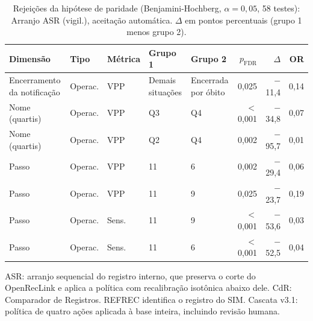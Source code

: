 \begin{table}[htbp]
\centering
\caption{Rejei\c{c}\~oes da hip\'otese de paridade (Benjamini-Hochberg, $\alpha = 0{,}05$, 58 testes): Arranjo ASR (vigil.), aceitação automática. $\Delta$ em pontos percentuais (grupo 1 menos grupo 2).}
\label{tab:equidade-arranjo-rejeicoes-arranjo-P-vigilancia}
\footnotesize\setlength{\tabcolsep}{3pt}
\begin{tabular}{lllllrrr}
\toprule
Dimens\~ao & Tipo & M\'etrica & Grupo 1 & Grupo 2 & $p_{\mathrm{FDR}}$ & $\Delta$ & OR \\
\midrule
Encerramento da notifica\c{c}\~ao & Operac. & VPP & Demais situa\c{c}\~oes & Encerrada por \'obito & 0{,}025 & $-$11{,}4 & 0{,}14 \\
Nome (quartis) & Operac. & VPP & Q3 & Q4 & $<$0{,}001 & $-$34{,}8 & 0{,}07 \\
Nome (quartis) & Operac. & VPP & Q2 & Q4 & 0{,}002 & $-$95{,}7 & 0{,}01 \\
Passo & Operac. & VPP & 11 & 6 & 0{,}002 & $-$29{,}4 & 0{,}06 \\
Passo & Operac. & VPP & 11 & 9 & 0{,}025 & $-$23{,}7 & 0{,}19 \\
Passo & Operac. & Sens. & 11 & 9 & $<$0{,}001 & $-$53{,}6 & 0{,}03 \\
Passo & Operac. & Sens. & 11 & 6 & $<$0{,}001 & $-$52{,}5 & 0{,}04 \\
\bottomrule
\end{tabular}
\par{}\par\footnotesize ASR: arranjo sequencial do registro interno, que preserva o corte do OpenRecLink e aplica a política com recalibração isotônica abaixo dele. CdR: Comparador de Registros. REFREC identifica o registro do SIM. Cascata v3.1: política de quatro ações aplicada à base inteira, incluindo revisão humana.
\end{table}
